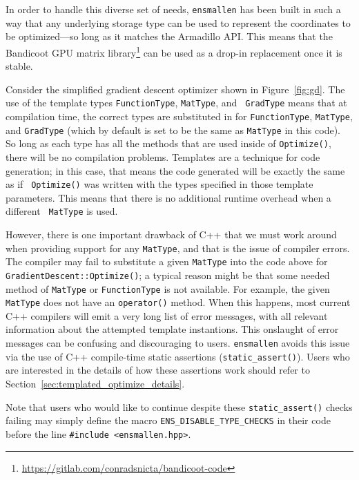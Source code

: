 In order to handle this diverse set of needs, {\tt ensmallen} has been built in
such a way that any underlying storage type can be used to represent the
coordinates to be optimized---so long as it matches the Armadillo API.
This means that the Bandicoot GPU matrix library\footnote{\url{https://gitlab.com/conradsnicta/bandicoot-code}}
can be used as a drop-in replacement once it is stable.

Consider the simplified gradient descent optimizer shown in Figure~\ref{fig:gd}.
The use of the template types {\tt FunctionType}, {\tt MatType}, and {\tt
GradType} means that at compilation time, the correct types are substituted in
for {\tt FunctionType}, {\tt MatType}, and {\tt GradType} (which by default is
set to be the same as {\tt MatType} in this code).  So long as each type has all
the methods that are used inside of {\tt Optimize()}, there will be no
compilation problems.  Templates are a technique for code generation; in this
case, that means the code generated will be exactly the same as if {\tt
Optimize()} was written with the types specified in those template parameters.
This means that there is no additional runtime overhead when a different {\tt
MatType} is used.


However, there is one important drawback of C++ that we must work around when
providing support for any {\tt MatType}, and that is the issue of compiler
errors.  The compiler may fail to substitute a given {\tt MatType} into the
code above for {\tt GradientDescent::Optimize()}; a typical reason might be that
some needed method of {\tt MatType} or {\tt FunctionType} is not available.
For example, the given {\tt MatType} does not have an {\tt operator\*()} method.
When this happens, most current C++ compilers will emit a very long list
of error messages, with all relevant information about the attempted
template instantions.
This onslaught of error messages can be confusing and discouraging to users.
{\tt ensmallen} avoids this issue via the use of C++ compile-time static
assertions ({\tt static\_assert()}).
Users who are interested in the details of how these assertions work should
refer to Section~\ref{sec:templated_optimize_details}.

Note that users who would like to continue despite these {\tt static\_assert()}
checks failing may simply define the macro {\tt ENS\_DISABLE\_TYPE\_CHECKS} in
their code before the line {\tt \#include <ensmallen.hpp>}.

